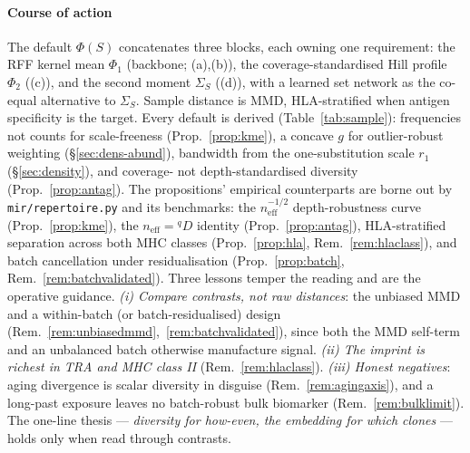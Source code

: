\documentclass[11pt]{article}
\theoremstyle{oldplain}
\theoremstyle{oldrem}
\newcommand{\code}[1]{\texttt{#1}}
\begin{document}
\paragraph{Course of action} The default $\Phi(S)$ concatenates three blocks, each owning one requirement:
the {\scshape RFF} kernel mean $\Phi_1$ (backbone; (a),(b)), the coverage-standardised Hill profile $\Phi_2$
((c)), and the second moment $\Sigma_S$ ((d)), with a learned set network as the co-equal alternative to
$\Sigma_S$. Sample distance is {\scshape MMD}, {\scshape HLA}-stratified when antigen specificity is the target.
Every default is derived (Table~\ref{tab:sample}): frequencies not counts for scale-freeness
(Prop.~\ref{prop:kme}), a concave $g$ for outlier-robust weighting (\S\ref{sec:dens-abund}), bandwidth from the
one-substitution scale $r_1$ (\S\ref{sec:density}), and coverage- not depth-standardised diversity
(Prop.~\ref{prop:antag}). The propositions' empirical counterparts are borne out by \code{mir/repertoire.py} and
its benchmarks: the $n_{\mathrm{eff}}^{-1/2}$ depth-robustness curve (Prop.~\ref{prop:kme}), the
$n_{\mathrm{eff}}\!=\!{}^qD$ identity (Prop.~\ref{prop:antag}), {\scshape HLA}-stratified separation across both
{\scshape MHC} classes (Prop.~\ref{prop:hla}, Rem.~\ref{rem:hlaclass}), and batch cancellation under
residualisation (Prop.~\ref{prop:batch}, Rem.~\ref{rem:batchvalidated}). Three lessons temper the reading and are
the operative guidance. \emph{(i) Compare contrasts, not raw distances}: the unbiased {\scshape MMD} and a
within-batch (or batch-residualised) design (Rem.~\ref{rem:unbiasedmmd},~\ref{rem:batchvalidated}), since both
the {\scshape MMD} self-term and an unbalanced batch otherwise manufacture signal. \emph{(ii) The imprint is
richest in {\scshape TRA} and {\scshape MHC} class II} (Rem.~\ref{rem:hlaclass}). \emph{(iii) Honest negatives}:
aging divergence is scalar diversity in disguise (Rem.~\ref{rem:agingaxis}), and a long-past exposure leaves no
batch-robust bulk biomarker (Rem.~\ref{rem:bulklimit}). The one-line thesis --- \emph{diversity for how-even,
the embedding for which clones} --- holds only when read through contrasts.
\end{document}
